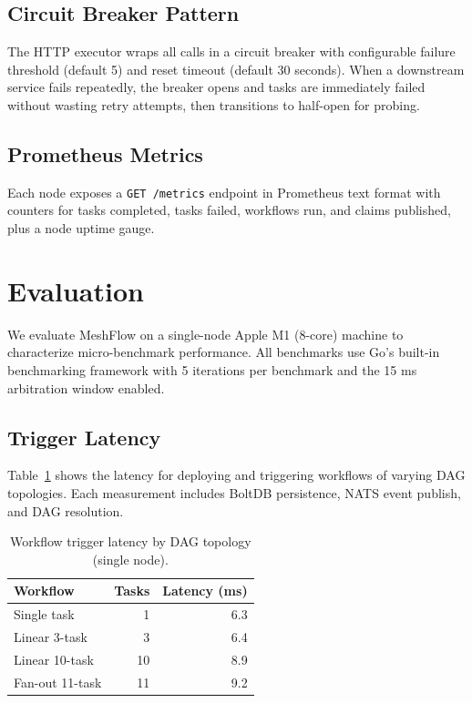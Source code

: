 \documentclass[sigconf]{acmart}
\begin{document}
\subsection{Circuit Breaker Pattern}

The HTTP executor wraps all calls in a circuit breaker with configurable failure threshold (default 5) and reset timeout (default 30 seconds). When a downstream service fails repeatedly, the breaker opens and tasks are immediately failed without wasting retry attempts, then transitions to half-open for probing.

\subsection{Prometheus Metrics}

Each node exposes a \texttt{GET /metrics} endpoint in Prometheus text format with counters for tasks completed, tasks failed, workflows run, and claims published, plus a node uptime gauge.

\section{Evaluation}

We evaluate MeshFlow on a single-node Apple M1 (8-core) machine to characterize micro-benchmark performance. All benchmarks use Go's built-in benchmarking framework with 5 iterations per benchmark and the 15 ms arbitration window enabled.

\subsection{Trigger Latency}

Table~\ref{tab:trigger-latency} shows the latency for deploying and triggering workflows of varying DAG topologies. Each measurement includes BoltDB persistence, NATS event publish, and DAG resolution.

\begin{table}[h]
\centering
\caption{Workflow trigger latency by DAG topology (single node).}
\label{tab:trigger-latency}
\begin{tabular}{lrr}
\toprule
\textbf{Workflow} & \textbf{Tasks} & \textbf{Latency (ms)} \\
\midrule
Single task & 1 & 6.3 \\
Linear 3-task & 3 & 6.4 \\
Linear 10-task & 10 & 8.9 \\
Fan-out 11-task & 11 & 9.2 \\
\bottomrule
\end{tabular}
\end{table}
\end{document}
